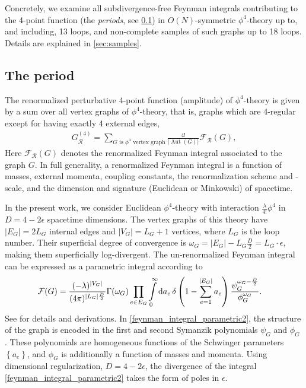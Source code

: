 \documentclass[12pt,a4paper]{article}
\newcommand{\abs}[1]{\lvert #1 \rvert}
\renewcommand{\d}{\textnormal{d}}
\newcommand{\ren} {{  \mathcal R}}
\newcommand{\Aut}{\operatorname{Aut}}
\renewcommand{\|}{\rule[-0.4ex]{0.2ex}{1.2em}}
\begin{document}
	Concretely, we examine all  subdivergence-free Feynman integrals contributing to the 4-point function (the \emph{periods}, see \cref{sec:period}) in $O(N)$-symmetric $\phi^4$-theory up to, and including, 13 loops, and non-complete samples of such graphs up to 18 loops. Details are explained in \cref{sec:samples}. 	

	
	\subsection{The period}\label{sec:period}
	The renormalized perturbative 4-point function (amplitude) of $\phi^4$-theory is given by a sum over all vertex graphs of $\phi^4$-theory, that is, graphs which are 4-regular except for having exactly 4 external edges, 
	\begin{align}\label{perturbation_series}
		G_\ren^{(4)}=\sum_{G \text{ is $\phi^4$ vertex graph}} \frac{4!}{\abs{\Aut(G)}} \mathcal F_\ren(G), 
	\end{align}
	Here $\mathcal F_\ren(G)$ denotes the renormalized Feynman integral associated to the graph $G$. 
	In full generality, a renormalized Feynman integral is a function of masses, external momenta, coupling constants, the renormalization scheme and -scale, and the dimension and signature (Euclidean or Minkowski) of spacetime. 
	
	In the present work, we consider  Euclidean $\phi^4$-theory with interaction $\frac{\lambda}{4!}\phi^4$ in  $D=4-2\epsilon$ spacetime dimensions. The vertex graphs of this theory have $\abs{E_G}=2 L_G$ internal edges and $\abs{V_G}= L_G+1$ vertices, where $L_G$ is the loop number. Their superficial degree of convergence   is $\omega_G=\abs{E_G}-  L_G \frac D 2=L_G\cdot \epsilon$, making them superficially log-divergent. 
	The un-renormalized Feynman integral can be expressed as a parametric integral according to  
	\begin{align}\label{feynman_integral_parametric2}
		\mathcal F (G) &=   \frac{ (- \lambda )^{\abs{V_G}}}{(4\pi)^{\abs{L_G} \frac D 2}}    \Gamma(\omega_G)  \prod_{e\in E_G} \int \limits_0^\infty  \d a_e   \, \delta \left( 1-\sum_{e=1}^{\abs{E_G}} a_e \right) \frac{\psi_G^{\omega_G-\frac D 2}}{\phi_G^{\omega_G}} .
	\end{align}
	See \cite{nakanishi_graph_1971,panzer_feynman_2015} for details and derivations.
	In \cref{feynman_integral_parametric2}, the structure of the graph is encoded in the first and second Symanzik polynomials $\psi_G$ and $\phi_G$ \cite{bogner_feynman_2010}. These polynomials are homogeneous functions of the Schwinger parameters $\left \lbrace a_e \right \rbrace   $, and $\phi_G$ is additionally a function of masses and momenta. Using dimensional regularization, $D=4-2\epsilon$, the divergence of the integral \cref{feynman_integral_parametric2} takes the form of poles in $\epsilon$. 
	
\end{document}
